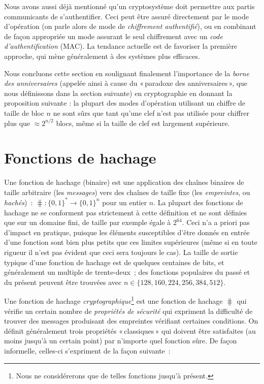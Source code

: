 Nous avons aussi déjà mentionné qu'un cryptosystème doit permettre aux partis communicants de s'authentifier. Ceci peut être assuré directement
par le mode d'opération (on parle alors de mode de \emph{chiffrement authentifié}), ou en combinant de façon appropriée un mode assurant le seul chiffrement avec
un \emph{code d'authentification} (MAC).
La tendance actuelle est de favoriser la première approche, qui mène généralement à des systèmes plus efficaces.


Nous concluons cette section en soulignant finalement l'importance de la \emph{borne des anniversaires} (appelée ainsi à cause du «\,paradoxe des anniversaires\,»,
que nous définissons dans la section suivante) en cryptographie en donnant la proposition suivante : la plupart des modes d'opération
utilisant un chiffre de taille de bloc $n$ ne sont sûrs que tant qu'une clef n'est pas utilisée pour chiffrer plus que $\approx 2^{n/2}$ blocs,
même si la taille de clef est largement supérieure.




\section{Fonctions de hachage}

Une fonction de hachage (binaire) est une application des chaînes binaires de taille arbitraire (les \emph{messages}) vers des chaînes de taille
fixe (les \emph{empreintes}, ou \emph{hachés})~:
$\hash : \{0,1\}^* \rightarrow \{0,1\}^n$ pour un entier $n$.
La plupart des fonctions de hachage ne se conforment pas strictement à cette définition et ne sont définies que sur un domaine fini, de taille par exemple égale
à $2^{64}$. Ceci n'a a priori pas d'impact en pratique, puisque les éléments susceptibles d'être donnés en entrée d'une fonction sont bien plus petits que ces
limites supérieures (même si en toute rigueur il n'est pas évident que ceci sera toujours le cas). 
La taille de sortie typique d'une fonction de hachage est de quelques centaines de bits, et généralement un multiple de trente-deux~; des fonctions populaires
du passé et du présent peuvent être trouvées avec 
$n \in \{128, 160, 224, 256, 384, 512\}$.

Une fonction de hachage \emph{cryptographique}\footnote{Nous ne considérerons que de telles fonctions jusqu'à présent.} est une fonction
de hachage $\hash$ qui vérifie un certain nombre de \emph{propriétés de sécurité} qui expriment la difficulté de trouver des messages
produisant des empreintes vérifiant certaines conditions. On définit généralement trois propriétés «\,classiques\,» qui doivent être satisfaites
(au moins jusqu'à un certain point) par n'importe quel fonction sûre. De façon informelle, celles-ci s'expriment de la façon suivante~:

